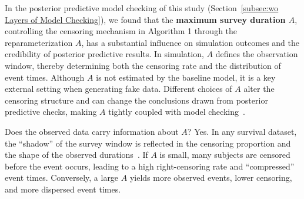 In the posterior predictive model checking of this study (Section~\ref{subsec:wo Layers of Model Checking}), we found that the \textbf{maximum survey duration $A$}, controlling the censoring mechanism in Algorithm 1 through the reparameterization $A$, has a substantial influence on simulation outcomes and the credibility of posterior predictive results. In simulation, $A$ defines the observation window, thereby determining both the censoring rate and the distribution of event times. Although $A$ is not estimated by the baseline model, it is a key external setting when generating fake data. Different choices of $A$ alter the censoring structure and can change the conclusions drawn from posterior predictive checks, making $A$ tightly coupled with model checking~\cite{https://doi.org/10.1002/sim.4385, stats5010006}.

Does the observed data carry information about $A$? Yes. In any survival dataset, the “shadow” of the survey window is reflected in the censoring proportion and the shape of the observed durations~\cite{barrajón2020effectrightcensoringbias, stats5010006, bartovs2022informed}. If $A$ is small, many subjects are censored before the event occurs, leading to a high right-censoring rate and “compressed” event times. Conversely, a large $A$ yields more observed events, lower censoring, and more dispersed event times.

